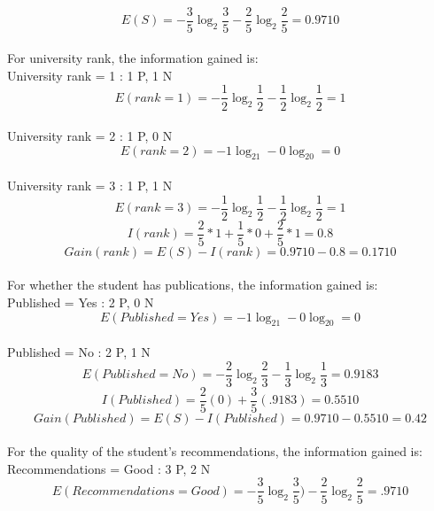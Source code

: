 \documentclass[12pt]{article}
\begin{document}
\\
\begin{equation}
E(S) = -\frac{3}{5}\log_2\frac{3}{5} -\frac{2}{5}\log_2\frac{2}{5} = 0.9710
\end{equation}
\\
For university rank, the information gained is:
\\
University rank = 1 : 1 P, 1 N
\begin{equation}
E(rank = 1) = -\frac{1}{2}\log_2\frac{1}{2} -\frac{1}{2}\log_2\frac{1}{2} = 1
\end{equation}
\\
University rank = 2 : 1 P, 0 N
\begin{equation}
E(rank = 2) = -1\log_21 -0\log_20 = 0
\end{equation}
\\
University rank = 3 : 1 P, 1 N
\begin{equation}
E(rank = 3) = -\frac{1}{2}\log_2\frac{1}{2} -\frac{1}{2}\log_2\frac{1}{2} = 1
\end{equation}
\begin{equation}
I(rank) = \frac{2}{5} * 1 + \frac{1}{5} * 0 + \frac{2}{5} * 1 = 0.8
\end{equation}
\begin{equation}
Gain(rank) = E(S) - I(rank) = 0.9710 - 0.8 = 0.1710
\end{equation}
\\
For whether the student has publications, the information gained is:
\\
Published = Yes : 2 P, 0 N
\begin{equation}
E(Published = Yes) = -1\log_21 - 0\log_20 = 0
\end{equation}
\\
Published = No : 2 P, 1 N
\begin{equation}
E(Published = No) = -\frac{2}{3}\log_2\frac{2}{3} - \frac{1}{3}\log_2\frac{1}{3} = 0.9183
\end{equation}
\begin{equation}
I(Published) = \frac{2}{5}(0)+\frac{3}{5}(.9183) = 0.5510
\end{equation}
\begin{equation}
Gain(Published) = E(S) - I(Published) = 0.9710 - 0.5510 = 0.42
\end{equation}
\\
For the quality of the student's recommendations, the information gained is:
\\
Recommendations = Good : 3 P, 2 N
\begin{equation}
E(Recommendations = Good) = -\frac{3}{5}\log_2\frac{3}{5}) - \frac{2}{5}\log_2\frac{2}{5} = .9710
\end{equation}
\end{document}
